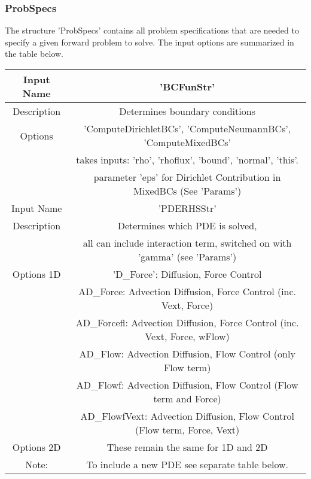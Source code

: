 \documentclass[11pt, a4paper]{article}
\theoremstyle{definition}
\begin{document}
\subsubsection{ProbSpecs}
The structure 'ProbSpecs' contains all problem specifications that are needed to specify a given forward problem to solve. The input options are summarized in the table below.
   \begin{center}
	\begin{tabular}{ |c| c | }
		\hline
		Input Name & 'BCFunStr' \\ 
		\hline
		Description & Determines boundary conditions\\ 
		\hline 
		Options & 'ComputeDirichletBCs', 'ComputeNeumannBCs', 'ComputeMixedBCs' \\
		& takes inputs: 'rho', 'rhoflux', 'bound', 'normal', 'this'. \\
		& parameter 'eps' for Dirichlet Contribution in MixedBCs  (See 'Params') \\
		\hline
		\hline
		Input Name & 'PDERHSStr' \\ 
		\hline
		Description & Determines which PDE is solved,\\ 
		& all can include interaction term, switched on with 'gamma' (see 'Params')\\
		\hline 
		Options 1D & 'D\_Force': Diffusion, Force Control \\
		&  AD\_Force: Advection Diffusion, Force Control (inc. Vext, Force) \\
		&  AD\_Forcefl: Advection Diffusion, Force Control (inc. Vext, Force, wFlow) \\
		&  AD\_Flow: Advection Diffusion, Flow Control (only Flow term) \\
		&  AD\_Flowf: Advection Diffusion, Flow Control (Flow term and Force) \\
		&  AD\_FlowfVext: Advection Diffusion, Flow Control (Flow term, Force, Vext) \\
		\hline
		Options 2D & These remain the same for 1D and 2D\\
		\hline
        Note: & To include a new PDE see separate table below.\\
	    \hline		
	\end{tabular}
\end{center}
\end{document}
